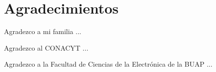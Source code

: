 \chapter{Agradecimientos}

Agradezco a mi familia ...

Agradezco al CONACYT ...

Agradezco a la Facultad de Ciencias de la Electrónica de la BUAP  ...